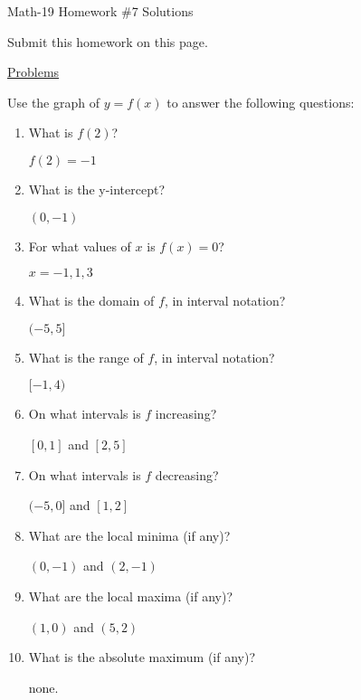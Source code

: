 \documentclass[letterpaper,12pt,fleqn]{article}
\begin{document}
\begin{center}
\Large Math-19 Homework \#7 Solutions
\end{center}

\vspace{0.5in}

Submit this homework on this page.

\underline{Problems}

Use the graph of $y=f(x)$ to answer the following questions:


\begin{enumerate}
\item What is $f(2)$?

  $f(2)=-1$

\item What is the y-intercept?

  $(0,-1)$

\item For what values of $x$ is $f(x)=0$?

  $x=-1,1,3$

\item What is the domain of $f$, in interval notation?

  $(-5,5]$

  \newpage

\item What is the range of $f$, in interval notation?
  
  $[-1,4)$

\item On what intervals is $f$ increasing?

  $[0,1]$ and $[2,5]$

\item On what intervals is $f$ decreasing?

  $(-5,0]$ and $[1,2]$

\item What are the local minima (if any)?

  $(0,-1)$ and $(2,-1)$

\item What are the local maxima (if any)?

  $(1,0)$ and $(5,2)$

\item What is the absolute maximum (if any)?

  none.
  
\end{enumerate}
\end{document}
